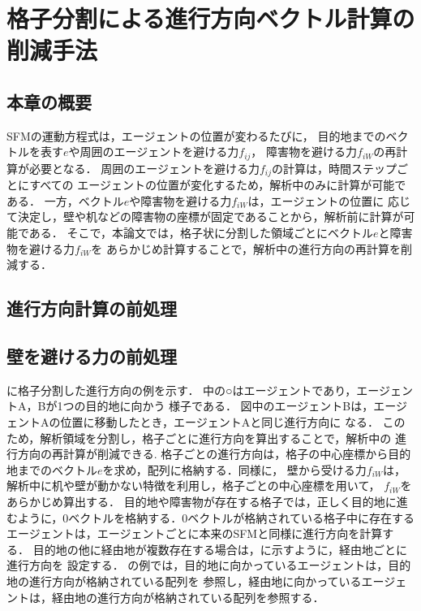 \chapter{格子分割による進行方向ベクトル計算の削減手法}
\label{sec:method}
\section{本章の概要}
SFMの運動方程式は，エージェントの位置が変わるたびに，
目的地までのベクトルを表す$e$や周囲のエージェントを避ける力$f_{ij}$，
障害物を避ける力$f_{iW}$の再計算が必要となる．
周囲のエージェントを避ける力$f_{ij}$の計算は，時間ステップごとにすべての
エージェントの位置が変化するため，解析中のみに計算が可能である．
一方，ベクトル$e$や障害物を避ける力$f_{iW}$は，エージェントの位置に
応じて決定し，壁や机などの障害物の座標が固定であることから，解析前に計算が可能である．
そこで，本論文では，格子状に分割した領域ごとにベクトル$e$と障害物を避ける力$f_{iW}$を
あらかじめ計算することで，解析中の進行方向の再計算を削減する．

\section{進行方向計算の前処理}

\section{壁を避ける力の前処理}

に格子分割した進行方向の例を示す．
中の○はエージェントであり，エージェントA，Bが1つの目的地に向かう
様子である．
図中のエージェントBは，エージェントAの位置に移動したとき，エージェントAと同じ進行方向に
なる．
このため，解析領域を分割し，格子ごとに進行方向を算出することで，解析中の
進行方向の再計算が削減できる.	
格子ごとの進行方向は，格子の中心座標から目的地までのベクトル$e$を求め，配列に格納する．同様に，
壁から受ける力$f_{iW}$は，解析中に机や壁が動かない特徴を利用し，格子ごとの中心座標を用いて，
$f_{iW}$をあらかじめ算出する．
目的地や障害物が存在する格子では，正しく目的地に進むように，0ベクトルを格納する．0ベクトルが格納されている格子中に存在する
エージェントは，エージェントごとに本来のSFMと同様に進行方向を計算する．
目的地の他に経由地が複数存在する場合は，に示すように，経由地ごとに進行方向を
設定する．
の例では，目的地に向かっているエージェントは，目的地の進行方向が格納されている配列を
参照し，経由地に向かっているエージェントは，経由地の進行方向が格納されている配列を参照する．


